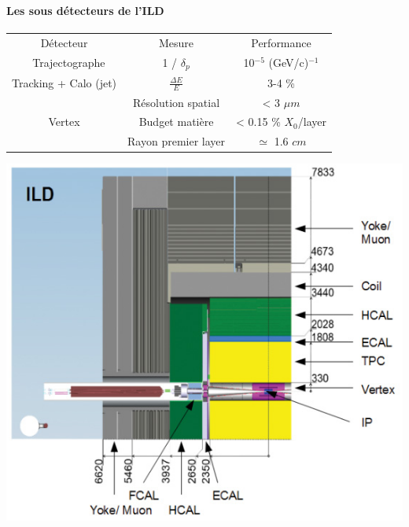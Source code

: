 \documentclass[8pt]{beamer}
\begin{document}
  
  \begin{frame}
  \frametitle{\secname}
  \framesubtitle{Les sous détecteurs de l'ILD}
    \begin{minipage}{0.62\linewidth}
      \begin{table}
        \begin{tabular}{c|c|c}
          \hline
          \multicolumn{1}{c}{Détecteur} & \multicolumn{1}{c}{Mesure} & \multicolumn{1}{c}{Performance} \\ 
          \hline \hline
          Trajectographe & 1 / $\delta_p$                           & 10$^{-5}$ (GeV/c)$^{-1}$ \\
          Tracking + Calo (jet)   & $\frac{\Delta E}{E}$                     & 3-4 \% \\ 
          \multirow{3}{*}{Vertex}         & {\footnotesize Résolution spatial}       & {\footnotesize < 3 $\mu m$} \\ 
          ~              & {\footnotesize Budget matière}           & {\footnotesize < 0.15 \% $X_{0}$/layer} \\
          ~              & {\footnotesize Rayon premier layer}      & {\footnotesize $\simeq$ 1.6 $cm$}
        \end{tabular}
      \end{table}
    \end{minipage} \hfill
    \begin{minipage}{0.36\linewidth}
      \includegraphics[width=\linewidth]{ild_vue_en_coupe.png}

\end{minipage}
\end{frame}
\end{document}
